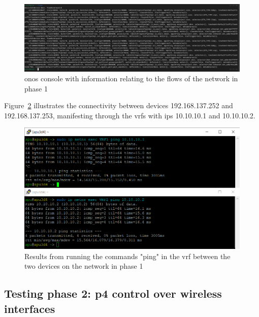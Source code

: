 \begin{figure}
	\centering
	\includegraphics[width=\textwidth]{Chapters/Figures/tests/bmv2_phase_1/flows.PNG}
	\caption{\gls{onos} console with information relating to the flows of the network in phase 1}
	\label{fig:exp2_phase1_onos_flows}
\end{figure}

Figure~\ref{fig:exp2_phase1_pings} illustrates the connectivity between devices 192.168.137.252 and 192.168.137.253, manifesting through the \glspl{vrf} with \glspl{ip} 10.10.10.1 and 10.10.10.2.

\begin{figure}
	\centering
	\includegraphics[width=\textwidth]{Chapters/Figures/tests/bmv2_phase_1/pings-2.PNG}
	\caption{Results from running the commands "ping" in the \gls{vrf} between the two devices on the network in phase 1}
	\label{fig:exp2_phase1_pings}
\end{figure}

\subsection[Testing phase 2: P4 control over wireless interfaces]{Testing phase 2: \gls{p4} control over wireless interfaces}


